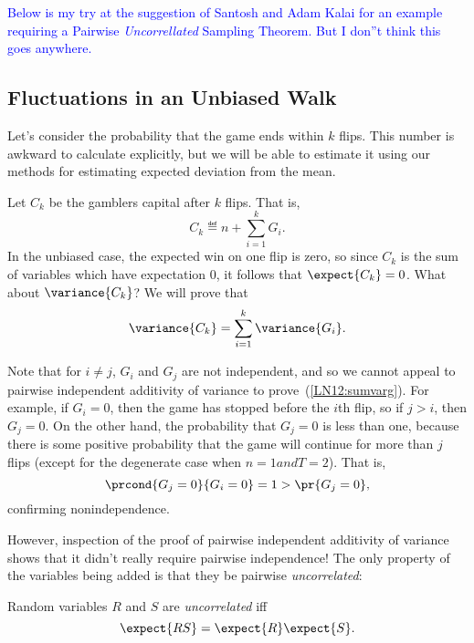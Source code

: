 \iffalse

\textcolor{blue}{Below is my try at the suggestion of Santosh and Adam
  Kalai for an example requiring a Pairwise \emph{Uncorrellated}
  Sampling Theorem.  But I don''t think this goes anywhere.}

\subsection{Fluctuations in an Unbiased Walk}

Let's consider the probability that the game ends within $k$ flips.  This
number is awkward to calculate explicitly, but we will be able to estimate
it using our methods for estimating expected deviation from the mean.

Let $C_k$ be the gamblers capital after $k$ flips.  That is,
\[
C_k \eqdef n + \sum_{i=1}^k G_i.
\]
In the unbiased case, the expected win on one flip is zero, so since $C_k$
is the sum of variables which have expectation 0, it follows that
$\expect{C_k} = 0$.  What about $\variance{C_k}$?  We will prove that
\begin{equation}\label{LN12:sumvarg}
\variance{C_k} = \sum_{i=1}^k \variance{G_i}.
\end{equation}

Note that for $i \neq j$, $G_i$ and $G_j$ are not independent, and so we
cannot appeal to pairwise independent additivity of variance to
prove~(\ref{LN12:sumvarg}).  For example, if $G_i = 0$, then the game has
stopped before the $i$th flip, so if $j > i$, then $G_j = 0$.  On the
other hand, the probability that $G_j = 0$ is less than one, because there
is some positive probability that the game will continue for more than $j$
flips (except for the degenerate case when $n=1 and T=2$).  That is,
\[
\prcond{G_j = 0}{G_i = 0} = 1 > \pr{G_j = 0},
\]
confirming nonindependence.

However, inspection of the proof of pairwise independent additivity of
variance shows that it didn't really require pairwise independence!  The
only property of the variables being added is that they be pairwise
\emph{uncorrelated}:

\begin{definition*}
Random variables $R$ and $S$ are \emph{uncorrelated} iff
\begin{equation}\label{LN12:uncor}
\expect{RS} = \expect{R}\expect{S}.
\end{equation}
\end{definition*}

